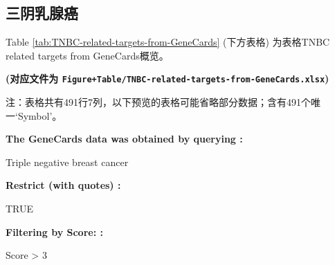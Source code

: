 \documentclass[
]{article}
\begin{document}
\hypertarget{ux4e09ux9634ux4e73ux817aux764c}{%
\subsection{三阴乳腺癌}\label{ux4e09ux9634ux4e73ux817aux764c}}

Table \ref{tab:TNBC-related-targets-from-GeneCards} (下方表格) 为表格TNBC related targets from GeneCards概览。

\textbf{(对应文件为 \texttt{Figure+Table/TNBC-related-targets-from-GeneCards.xlsx})}

\begin{center}\begin{tcolorbox}[colback=gray!10, colframe=gray!50, width=0.9\linewidth, arc=1mm, boxrule=0.5pt]注：表格共有491行7列，以下预览的表格可能省略部分数据；含有491个唯一`Symbol'。
\end{tcolorbox}
\end{center}\begin{center}\begin{tcolorbox}[colback=gray!10, colframe=gray!50, width=0.9\linewidth, arc=1mm, boxrule=0.5pt]
\textbf{
The GeneCards data was obtained by querying
:}

\vspace{0.5em}

    Triple negative breast cancer

\vspace{2em}


\textbf{
Restrict (with quotes)
:}

\vspace{0.5em}

    TRUE

\vspace{2em}


\textbf{
Filtering by Score:
:}

\vspace{0.5em}

    Score > 3

\vspace{2em}
\end{tcolorbox}
\end{center}
\end{document}
